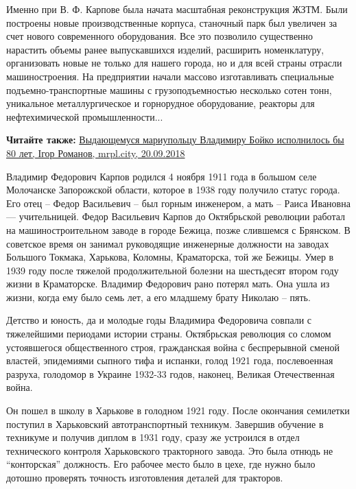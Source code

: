 
Именно при В. Ф. Карпове была начата масштабная реконструкция ЖЗТМ. Были
построены новые производственные корпуса, станочный парк был увеличен за счет
нового современного оборудования. Все это позволило существенно нарастить
объемы ранее выпускавшихся изделий, расширить номенклатуру, организовать новые
не только для нашего города, но и для всей страны отрасли машиностроения. На
предприятии начали массово изготавливать специальные  подъемно-транспортные
машины с грузоподъемностью несколько сотен тонн, уникальное металлургическое и
горнорудное оборудование, реакторы для нефтехимической промышленности...

\textbf{Читайте также:} \href{https://mrpl.city/news/view/vydayushhemusya-mariupoltsu-vladimiru-bojko-ispolnilos-by-80-let}{%
Выдающемуся мариупольцу Владимиру Бойко исполнилось бы 80 лет, Ігор Романов, mrpl.city, 20.09.2018}

Владимир Федорович Карпов родился 4 ноября 1911 года в большом селе Молочанске
Запорожской области, которое в 1938 году получило статус города. Его отец –
Федор Васильевич – был горным инженером, а мать – Раиса Ивановна —
учительницей. Федор Васильевич Карпов до Октябрьской революции работал на
машиностроительном заводе в городе Бежица, позже слившемся с Брянском. В
советское время он занимал руководящие инженерные должности на заводах Большого
Токмака, Харькова, Коломны, Краматорска, той же Бежицы. Умер в 1939 году после
тяжелой продолжительной болезни на шестьдесят втором году жизни в Краматорске.
Владимир Федорович рано потерял мать. Она ушла из жизни, когда ему было семь
лет, а его младшему брату Николаю – пять.

Детство и юность, да и молодые годы Владимира Федоровича совпали с тяжелейшими
периодами истории страны. Октябрьская революция со сломом устоявшегося
общественного строя, гражданская война с беспрерывной сменой властей,
эпидемиями сыпного тифа и испанки, голод 1921 года, послевоенная разруха,
голодомор в Украине 1932-33 годов, наконец, Великая Отечественная война.

Он пошел в школу в Харькове в голодном 1921 году. После окончания семилетки
поступил в Харьковский автотранспортный техникум. Завершив обучение в техникуме
и получив диплом в 1931 году, сразу же устроился в отдел технического контроля
Харьковского тракторного завода. Это была отнюдь не \enquote{конторская}
должность. Его рабочее место было в цехе, где нужно было дотошно проверять
точность изготовления деталей для тракторов.

